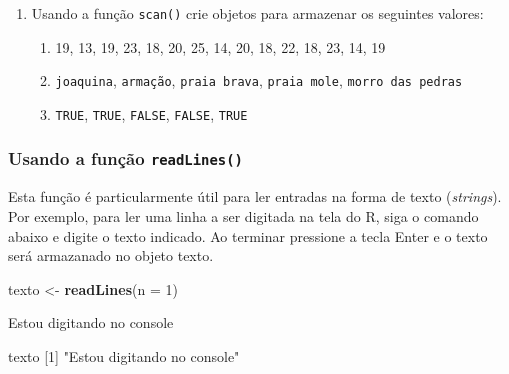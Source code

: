 \documentclass[10pt,a4paper]{book}
\newenvironment{Shaded}{\begin{snugshade}}{\end{snugshade}}
\newcommand{\KeywordTok}[1]{\textcolor[rgb]{0.13,0.29,0.53}{\textbf{#1}}}
\newcommand{\DataTypeTok}[1]{\textcolor[rgb]{0.13,0.29,0.53}{#1}}
\newcommand{\DecValTok}[1]{\textcolor[rgb]{0.00,0.00,0.81}{#1}}
\newcommand{\StringTok}[1]{\textcolor[rgb]{0.31,0.60,0.02}{#1}}
\newcommand{\NormalTok}[1]{#1}
\providecommand{\tightlist}{%
  \setlength{\itemsep}{0pt}\setlength{\parskip}{0pt}}
\begin{document}
\begin{enumerate}
\def\labelenumi{\arabic{enumi}.}
\tightlist
\item
  Usando a função \texttt{scan()} crie objetos para armazenar os
  seguintes valores:

  \begin{enumerate}
  \def\labelenumii{\alph{enumii}.}
  \tightlist
  \item
    19, 13, 19, 23, 18, 20, 25, 14, 20, 18, 22, 18, 23, 14, 19
  \item
    \texttt{joaquina}, \texttt{armação}, \texttt{praia\ brava},
    \texttt{praia\ mole}, \texttt{morro\ das\ pedras}
  \item
    \texttt{TRUE}, \texttt{TRUE}, \texttt{FALSE}, \texttt{FALSE},
    \texttt{TRUE}
  \end{enumerate}
\end{enumerate}

\subsubsection{\texorpdfstring{Usando a função
\texttt{readLines()}}{Usando a função readLines()}}\label{usando-a-funcao-readlines}

Esta função é particularmente útil para ler entradas na forma de texto
(\emph{strings}). Por exemplo, para ler uma linha a ser digitada na tela
do R, siga o comando abaixo e digite o texto indicado. Ao terminar
pressione a tecla Enter e o texto será armazanado no objeto texto.

\begin{Shaded}
\begin{Highlighting}[]
\NormalTok{texto <-}\StringTok{ }\KeywordTok{readLines}\NormalTok{(}\DataTypeTok{n =} \DecValTok{1}\NormalTok{)}
\end{Highlighting}
\end{Shaded}

\begin{Shaded}
\begin{Highlighting}[]
\NormalTok{Estou digitando no console}
\end{Highlighting}
\end{Shaded}

\begin{Shaded}
\begin{Highlighting}[]
\NormalTok{texto}
\NormalTok{[}\DecValTok{1}\NormalTok{] }\StringTok{"Estou digitando no console"}
\end{Highlighting}
\end{Shaded}
\end{document}
